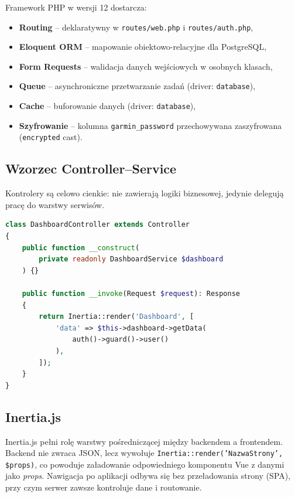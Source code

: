 \documentclass[12pt,a4paper]{report}
\begin{document}
Framework PHP w wersji 12 dostarcza:
\begin{itemize}[noitemsep]
    \item \textbf{Routing} -- deklaratywny w \texttt{routes/web.php} i \texttt{routes/auth.php},
    \item \textbf{Eloquent ORM} -- mapowanie obiektowo-relacyjne dla PostgreSQL,
    \item \textbf{Form Requests} -- walidacja danych wejściowych w osobnych klasach,
    \item \textbf{Queue} -- asynchroniczne przetwarzanie zadań (driver: \texttt{database}),
    \item \textbf{Cache} -- buforowanie danych (driver: \texttt{database}),
    \item \textbf{Szyfrowanie} -- kolumna \texttt{garmin\_password} przechowywana zaszyfrowana (\texttt{encrypted} cast).
\end{itemize}

\subsection{Wzorzec Controller--Service}

Kontrolery są celowo cienkie: nie zawierają logiki biznesowej, jedynie delegują pracę do warstwy serwisów.

\begin{lstlisting}[language=PHP, caption=Przykładowy kontroler delegujący do serwisu]
class DashboardController extends Controller
{
    public function __construct(
        private readonly DashboardService $dashboard
    ) {}

    public function __invoke(Request $request): Response
    {
        return Inertia::render('Dashboard', [
            'data' => $this->dashboard->getData(
                auth()->guard()->user()
            ),
        ]);
    }
}
\end{lstlisting}

\subsection{Inertia.js}

Inertia.js pełni rolę warstwy pośredniczącej między backendem a frontendem. Backend nie zwraca JSON, lecz wywołuje \texttt{Inertia::render('NazwaStrony', \$props)}, co powoduje załadowanie odpowiedniego komponentu Vue z danymi jako \textit{props}. Nawigacja po aplikacji odbywa się bez przeładowania strony (SPA), przy czym serwer zawsze kontroluje dane i routowanie.
\end{document}

